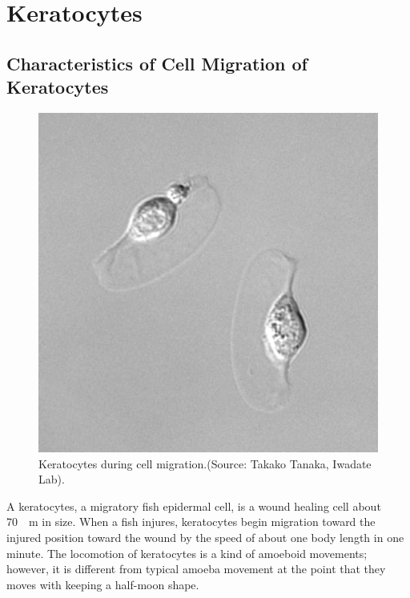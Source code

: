 \documentclass[a4paper,12pt]{book}
\begin{document}
\chapter{Keratocytes}
\section{Characteristics of Cell Migration of Keratocytes}
\begin{figure}[tbp]
\centering
\includegraphics[scale=0.4]{kera.eps}
\caption{Keratocytes during cell migration.(Source: Takako Tanaka, Iwadate Lab).}
\label{fig:kera}
\end{figure}

A keratocytes, a migratory fish epidermal cell, is a wound healing cell about \SI{70}{\mu m}  in size.
When a fish injures, keratocytes begin migration toward the injured position toward  the wound by the speed of about one body length in one minute.
The locomotion of keratocytes is a kind of amoeboid movements;
however, it is different from typical amoeba movement at the point that they moves  with keeping a half-moon shape. 
\end{document}
